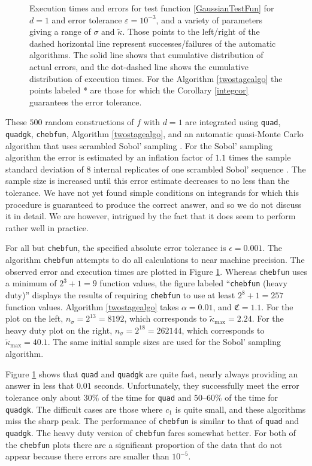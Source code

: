 \documentclass[graybox]{svmult}
\newcommand{\fudge}{\mathfrak{C}}
\newcommand{\tkappa}{\tilde{\kappa}}
\begin{document}
\begin{figure}
\caption{Execution times and errors for test function \eqref{GaussianTestFun} for $d=1$ and error tolerance $\varepsilon=10^{-3}$, and a variety of parameters giving a range of $\sigma$ and $\tkappa$. Those points to the left/right of the dashed horizontal line represent successes/failures of the automatic algorithms.  The solid line shows that cumulative distribution of actual errors, and the dot-dashed line shows the cumulative distribution of execution times.  For the Algorithm \ref{twostagealgo} the points labeled * are those for which the Corollary \ref{integcor} guarantees the error tolerance.\label{GaussianTestFunFig} }
\end{figure}

These $500$ random constructions of $f$ with $d=1$ are integrated using {\tt quad},  {\tt quadgk}, {\tt chebfun}, Algorithm \ref{twostagealgo}, and an automatic quasi-Monte Carlo algorithm that uses scrambled Sobol' sampling \citep{Owe95,Owe96,Owe97,Mat98,HonHic00a,DicPil10a}.  For the Sobol' sampling algorithm the error is estimated by an inflation factor of $1.1$ times the sample standard deviation of $8$ internal replicates of one scrambled Sobol' sequence \citep{Owe06a}.  The sample size is increased until this error estimate decreases to no less than the tolerance.  We have not yet found simple conditions on integrands for which this procedure is guaranteed to produce the correct answer, and so we do not discuss it in detail.  We are however, intrigued by the fact that it does seem to perform rather well in practice.

For all but {\tt chebfun}, the specified absolute error tolerance is $\epsilon=0.001$.  The algorithm {\tt chebfun} attempts to do all calculations to near machine precision.  The observed error and execution times are plotted in Figure \ref{GaussianTestFunFig}.  Whereas {\tt chebfun} uses a minimum of $2^3+1=9$ function values, the figure labeled ``{\tt chebfun} (heavy duty)'' displays the results of requiring {\tt chebfun} to use at least $2^{8}+1=257$ function values.  Algorithm \ref{twostagealgo} takes $\alpha=0.01$, and $\fudge=1.1$.  For the plot on the left, $n_\sigma=2^{13}=8192$, which corresponds to  $\tkappa_{\max}=2.24$.  For the heavy duty plot on the right, $n_\sigma=2^{18}=262144$, which corresponds to  $\tkappa_{\max}=40.1$.  The same initial sample sizes are used for the Sobol' sampling algorithm.

Figure \ref{GaussianTestFunFig} shows that {\tt quad} and {\tt quadgk} are quite fast, nearly always providing an answer in less that $0.01$ seconds.  Unfortunately, they successfully meet the error tolerance only about $30\%$ of the time for {\tt quad} and $50$--$60\%$ of the time for {\tt quadgk}.  The difficult cases are those where $c_1$ is quite small, and these algorithms miss the sharp peak.  The performance of {\tt chebfun} is similar to that of {\tt quad} and {\tt quadgk}.  The heavy duty version of  {\tt chebfun} fares somewhat better.  For both of the {\tt chebfun} plots there are a significant proportion of the data that do not appear because there errors are smaller than $10^{-5}$.
\end{document}

